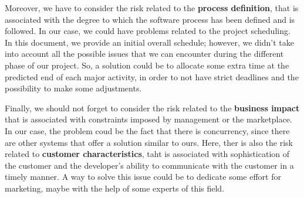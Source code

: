 Moreover, we have to consider the risk related to the \textbf{process definition}, that is associated with the degree to which the software process has been defined and is followed. In our case, we could have problems related to the project scheduling. In this document, we provide an initial overall schedule; however, we didn't take into account all the possible issues that we can encounter during the different phase of our project. So, a solution could be to allocate some extra time at the predicted end of each major activity, in order to not have strict deadlines and the possibility to make some adjustments. 

Finally, we should not forget to consider the risk related to the \textbf{business impact} that is associated with constraints imposed by management or the marketplace. In our case, the problem coud be the fact that there is concurrency, since there are other systems that offer a solution similar to ours. Here, ther is also the risk related to \textbf{customer characteristics}, taht is associated with sophistication of the customer and the developer's ability to communicate with the customer in a timely manner. A way to solve this issue could be to dedicate some effort for marketing, maybe with the help of some experts of this field.
